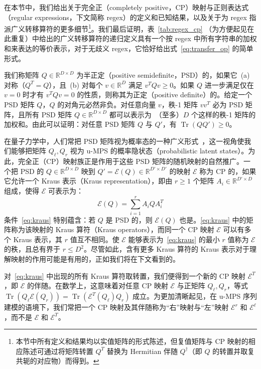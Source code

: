 \documentclass[twoside]{article}
\DeclareMathOperator{\Tr}{Tr}
\newcommand{\E}{\mc{E}}
\newcommand{\EL}{\mc{E}^{\scriptstyle \ell}}
\newcommand{\ER}{\mc{E}^{\scriptstyle r}}
\newcommand{\QL}{Q_{\ell}}
\newcommand{\QR}{Q_{r}}
\newcommand{\R}{\mathbb{R}}
\newcommand{\field}[1]{\R^{#1}}
\newcommand{\mc}[1]{\mathcal{#1}}
\begin{document}
在本节中，我们给出关于完全正（completely positive，CP）映射与正则表达式（regular expressions，下文简称 regex）的定义和已知结果，以及关于为 regex 指派广义转移算符的更多细节\footnote{本节中所有定义和结果均以实值矩阵的形式陈述，但复值矩阵与 CP 映射的相应陈述可通过将矩阵转置 $Q^T$ 替换为 Hermitian 伴随 $Q^\dagger$（即 $Q$ 的转置并取复共轭的对应物）而得到。}。我们最后证明，表~\ref{tab:regex_cp}
（为方便起见在此重复）中给出的广义转移算符的递归定义具有一个按 regex 中所有字符串的加权和来表达的等价表示，对于无歧义 regex，它恰好给出式~\ref{eq:transfer_op} 的简单形式。

我们称矩阵 $Q\in\field{D\times D}$ 为半正定（positive semidefinite，PSD）的，如果它~(a) 对称（$Q^T = Q$），且~(b) 对每个 $v\in\field{D}$ 满足 $v^T Q v \geq 0$。如果 $Q$ 进一步满足仅在 $v = 0$ 时才有 $v^T Q v = 0$ 的性质，则称其为正定（positive definite）的。给定一个 PSD 矩阵 $Q$，$Q$ 的对角元必然非负。对任意向量 $v$，秩-1 矩阵 $vv^T$ 必为 PSD 矩阵，且所有 PSD 矩阵 $Q\in\field{D\times D}$ 都可以表示为~（至多）$D$ 个这样的秩-1 矩阵的加权和。由此可以证明：对任意 PSD 矩阵 $Q$ 与 $Q'$，有 $\Tr(QQ') \geq0$。

在量子力学中，人们常把 PSD 矩阵视为概率态的一种广义形式~\citep{nielsen2002}，这一视角使我们能够把矩阵 $\QL, \QR$ 视为 u-MPS 的概率隐状态（probabilistic latent states）。为此，完全正（CP）映射族正是作用于这些 PSD 矩阵的随机映射的自然推广。一个把 PSD 的 $Q\in\field{D\times D}$ 映到 $Q'=\E(Q)\in\field{D'\times D'}$ 的映射 $\E$ 称为 CP 的，如果它允许一个 Kraus 表示（Kraus representation），即由 $r \geq 1$ 个矩阵 $A_i\in\field{D'\times D}$ 组成，使得 $\E$ 可表示为：
%
\begin{equation}
\label{eq:kraus}
\E(Q) = \sum_{i=1}^r A_i Q A_i^T
\end{equation}
%
条件~\eqref{eq:kraus} 特别蕴含：若 $Q$ 是 PSD 的，则 $\E(Q)$ 也是。\eqref{eq:kraus} 中的矩阵称为该映射的 Kraus 算符（Kraus operators），而同一个 CP 映射 $\E$ 可以有多个 Kraus 表示，其 $r$ 值互不相同。使 $\E$ 能够表示为~\eqref{eq:kraus} 的最小 $r$ 值称为 $\E$ 的秩，且总有界于 $r \leq D^2$。尽管如此，含有更多 Kraus 算符的 Kraus 表示对于理解映射的作用可能是有用的，正如我们将在下文看到的。

对~\eqref{eq:kraus} 中出现的所有 Kraus 算符取转置，我们便得到一个新的 CP 映射 $\E^T$，即 $\E$ 的伴随。在数学上，这意味着对任意 CP 映射 $\E$ 与正矩阵 $\QL, \QR$，等式 $\Tr(\QL \E(\QR)) = \Tr(\E^T(\QL) \QR)$ 成立。为更加清晰起见，在 u-MPS 序列建模的语境下，我们常把一个 CP 映射及其伴随称为``右''映射与``左''映射 $\ER$ 和 $\EL$，而不是 $\E$ 和 $\E^T$。
\end{document}
